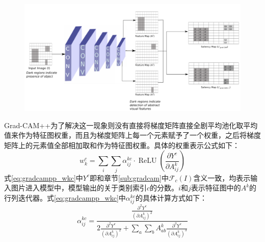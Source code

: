 \begin{figure}[h]
	\centering 
	\includegraphics[width=15cm]{fig/ch2/gradcampp1.png}
	\label{fig:gradcampp1}
\end{figure}


Grad-CAM++为了解决这一现象则没有直接将梯度矩阵直接全剧平均池化取平均值来作为特征图权重，而且为梯度矩阵上每一个元素赋予了一个权重，之后将梯度矩阵上的元素值全部相加取和作为特征图权重。具体的权重表示公式如下：
\begin{equation}
	w_{k}^{c}=\sum_{i} \sum_{j} \alpha_{i j}^{k c} \cdot \operatorname{ReLU}\left(\frac{\partial Y^{c}}{\partial A_{i j}^{k}}\right)  
	\label{eq:gradcampp_wkc}
\end{equation}
式\ref{eq:gradcampp_wkc}中$Y^{c}$即和章节\ref{sub:gradcam}$中\mathcal{F}_c(I)$含义一致，均表示输入图片进入模型中，模型输出的关于类别索引$c$的分数。$i$和$j$表示特征图中的$A^{k}$的行列迭代器。式\ref{eq:gradcampp_wkc}中$\alpha_{i j}^{k c}$的具体计算方式如下：
\begin{equation}
	\alpha_{i j}^{k c}=\frac{\frac{\partial^{2} Y^{c}}{\left(\partial A_{ij}^{k}\right)^{2}}}{2 \frac{\partial^{2} Y^{c}}{\left(\partial A_{i j}^{k}\right)^{2}}+\sum_{a} \sum_{b} A_{a b}^{k}\frac{\partial^{3} Y^{c}}{\left(\partial A_{i j}^{k}\right)^{3}}}
	\label{eq:gradcampp_akc}
\end{equation}

